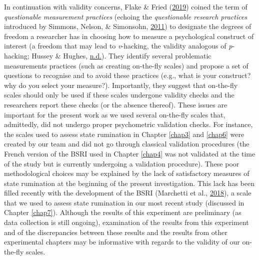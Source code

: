 \documentclass[a4paper,12pt,twoside,onecolumn,openright,final,oldfontcommands]{memoir}
\begin{document}
In continuation with validity concerns, Flake \& Fried (\protect\hyperlink{ref-flake_measurement_2019}{2019}) coined the term of \emph{questionable measurement practices} (echoing the \emph{questionable research practices} introduced by Simmons, Nelson, \& Simonsohn, \protect\hyperlink{ref-simmons_false-positive_2011}{2011}) to designate the degrees of freedom a researcher has in choosing how to measure a psychological construct of interest (a freedom that may lead to \emph{v}-hacking, the validity analogous of \emph{p}-hacking; Hussey \& Hughes, \protect\hyperlink{ref-hussey_hidden_2018}{n.d.}). They identify several problematic measurements practices (such as creating on-the-fly scales) and propose a set of questions to recognise and to avoid these practices (e.g., what is your construct? why do you select your measure?). Importantly, they suggest that on-the-fly scales should only be used if these scales undergone validity checks and the researchers report these checks (or the absence thereof). These issues are important for the present work as we used several on-the-fly scales that, admittedly, did not undergo proper psychometric validation checks. For instance, the scales used to assess state rumination in Chapter \ref{chap3} and \ref{chap6} were created by our team and did not go through classical validation procedures (the French version of the BSRI used in Chapter \ref{chap4} was not validated at the time of the study but is currently undergoing a validation procedure). These poor methodological choices may be explained by the lack of satisfactory measures of state rumination at the beginning of the present investigation. This lack has been filled recently with the development of the BSRI (Marchetti et al., \protect\hyperlink{ref-marchetti_brief_2018}{2018}), a scale that we used to assess state rumination in our most recent study (discussed in Chapter \ref{chap7}). Although the results of this experiment are preliminary (as data collection is still ongoing), examination of the results from this experiment and of the discrepancies between these results and the results from other experimental chapters may be informative with regards to the validity of our on-the-fly scales.
\end{document}
